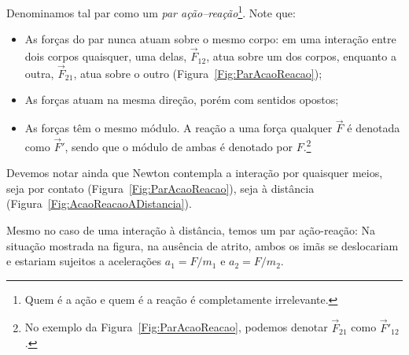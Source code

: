 \noindent{}Denominamos tal par como um \emph{par ação--reação}\footnote{Quem é a ação e quem é a reação é completamente irrelevante.}. Note que:
\begin{itemize}
    \item As forças do par nunca atuam sobre o mesmo corpo: em uma interação entre dois corpos quaisquer, uma delas, $\vec{F}_{12}$, atua sobre um dos corpos, enquanto a outra, $\vec{F}_{21}$, atua sobre o outro (Figura~\ref{Fig:ParAcaoReacao});
    \item As forças atuam na mesma direção, porém com sentidos opostos;
    \item As forças têm o mesmo módulo. A reação a uma força qualquer $\vec{F}$ é denotada como $\vec{F}'$, sendo que o módulo de ambas é denotado por $F$.\footnote{No exemplo da Figura~\ref{Fig:ParAcaoReacao}, podemos denotar $\vec{F}_{21}$ como $\vec{F}'_{12}$.}
\end{itemize}
%
Devemos notar ainda que Newton contempla a interação por quaisquer meios, seja por contato (Figura~\ref{Fig:ParAcaoReacao}), seja à distância (Figura~\ref{Fig:AcaoReacaoADistancia}).



\begin{marginfigure}
\centering
{}
\caption{Mesmo no caso de uma interação à distância, temos um par ação-reação: Na situação mostrada na figura, na ausência de atrito, ambos os imãs se deslocariam e estariam sujeitos a acelerações $a_1 = F/m_1$ e $a_2 = F/{m_2}$.\label{Fig:AcaoReacaoADistancia}}
\end{marginfigure}

